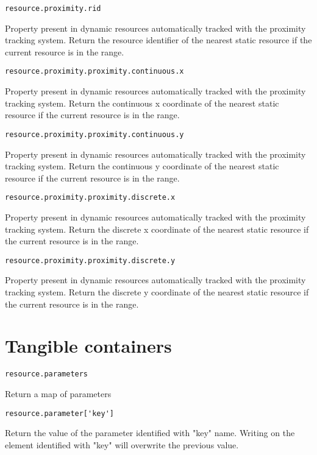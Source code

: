 \begin{lstlisting}
resource.proximity.rid
\end{lstlisting}
Property present in dynamic resources automatically tracked with the proximity tracking system. Return the resource identifier of the nearest static resource if the current resource is in the range.

\begin{lstlisting}
resource.proximity.proximity.continuous.x
\end{lstlisting}
Property present in dynamic resources automatically tracked with the proximity tracking system. Return the continuous x coordinate of the nearest static resource if the current resource is in the range.

\begin{lstlisting}
resource.proximity.proximity.continuous.y
\end{lstlisting}
Property present in dynamic resources automatically tracked with the proximity tracking system. Return the continuous y coordinate of the nearest static resource if the current resource is in the range.

\begin{lstlisting}
resource.proximity.proximity.discrete.x
\end{lstlisting}
Property present in dynamic resources automatically tracked with the proximity tracking system. Return the discrete x coordinate of the nearest static resource if the current resource is in the range.

\begin{lstlisting}
resource.proximity.proximity.discrete.y
\end{lstlisting}
Property present in dynamic resources automatically tracked with the proximity tracking system. Return the discrete y coordinate of the nearest static resource if the current resource is in the range.

\section{Tangible containers}

\begin{lstlisting}
resource.parameters
\end{lstlisting}
Return a map of parameters

\begin{lstlisting}
resource.parameter['key']
\end{lstlisting}
Return the value of the parameter identified with "key" name. Writing on the element identified with "key" will overwrite the previous value.

